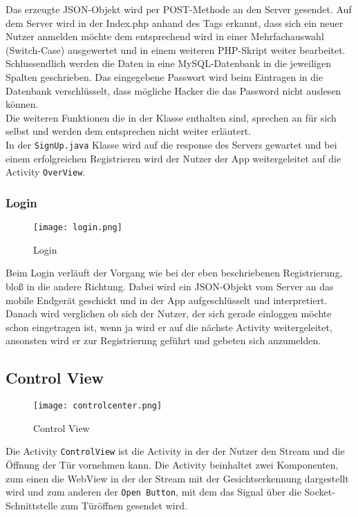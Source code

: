 Das erzeugte JSON-Objekt wird per POST-Methode an den Server gesendet. Auf dem Server wird in der Index.php anhand des Tags erkannt, dass sich ein neuer Nutzer anmelden möchte dem entsprechend wird in einer Mehrfachauswahl (Switch-Case) ausgewertet und in einem weiteren PHP-Skript weiter bearbeitet. Schlussendlich werden die Daten in eine MySQL-Datenbank in die jeweiligen Spalten geschrieben. Das eingegebene Passwort wird  beim Eintragen in die Datenbank verschlüsselt, dass mögliche Hacker die das Password nicht auslesen können.
\\
Die weiteren Funktionen die in der Klasse enthalten sind, sprechen an für sich selbst und werden dem entsprechen nicht weiter erläutert.
\\
In der \texttt{SignUp.java} Klasse wird auf die response des Servers gewartet und bei einem erfolgreichen Registrieren wird der Nutzer der App weitergeleitet auf die Activity \texttt{OverView}.
\newpage

 
\subsubsection{Login}
\begin{figure}[h]
  \begin{center}
    \texttt{[image: login.png]}
  		  \caption{Login}
     \label{fig.Prozess}
  \end{center}
\end{figure}

Beim Login verläuft der Vorgang wie bei der eben beschriebenen Registrierung, bloß in die andere Richtung. Dabei wird ein JSON-Objekt vom Server an das mobile Endgerät geschickt und in der App aufgeschlüsselt und interpretiert. Danach wird verglichen ob sich der Nutzer, der sich gerade einloggen möchte schon eingetragen ist, wenn ja wird er auf die nächste Activity weitergeleitet, ansonsten wird er zur Registrierung geführt und gebeten sich anzumelden.
\subsection{Control View}
\begin{figure}[h]
  \begin{center}
    \texttt{[image: controlcenter.png]}
  		  \caption{Control View}
     \label{fig.Prozess}
  \end{center}
\end{figure}
Die Activity \texttt{ControlView} ist die Activity in der der Nutzer den Stream und die Öffnung der Tür vornehmen kann. Die Activity beinhaltet zwei Komponenten, zum einen die WebView in der der Stream mit der Gesichtserkennung dargestellt wird und zum anderen der \texttt{Open Button}, mit dem das Signal über die Socket-Schnittstelle zum Türöffnen gesendet wird.

